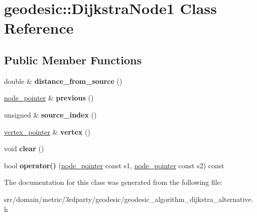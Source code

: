 \hypertarget{classgeodesic_1_1_dijkstra_node1}{}\section{geodesic\+:\+:Dijkstra\+Node1 Class Reference}
\label{classgeodesic_1_1_dijkstra_node1}
\subsection*{Public Member Functions}
\begin{DoxyCompactItemize}
\item 
\hypertarget{classgeodesic_1_1_dijkstra_node1_a4319ff7c12733f0d79aa119ddbd1bcdd}{}double \& {\bfseries distance\+\_\+from\+\_\+source} ()\label{classgeodesic_1_1_dijkstra_node1_a4319ff7c12733f0d79aa119ddbd1bcdd}

\item 
\hypertarget{classgeodesic_1_1_dijkstra_node1_abe89a88d7514fbad05b2ab66d995d8b0}{}\hyperlink{classgeodesic_1_1_dijkstra_node1}{node\+\_\+pointer} \& {\bfseries previous} ()\label{classgeodesic_1_1_dijkstra_node1_abe89a88d7514fbad05b2ab66d995d8b0}

\item 
\hypertarget{classgeodesic_1_1_dijkstra_node1_ac44a2aa7b48823d59145e240447ff1f5}{}unsigned \& {\bfseries source\+\_\+index} ()\label{classgeodesic_1_1_dijkstra_node1_ac44a2aa7b48823d59145e240447ff1f5}

\item 
\hypertarget{classgeodesic_1_1_dijkstra_node1_a88ef4f97b8e7070b07029c61d7e96904}{}\hyperlink{classgeodesic_1_1_vertex}{vertex\+\_\+pointer} \& {\bfseries vertex} ()\label{classgeodesic_1_1_dijkstra_node1_a88ef4f97b8e7070b07029c61d7e96904}

\item 
\hypertarget{classgeodesic_1_1_dijkstra_node1_ae6e22cf8c828285fbc89f149e3126b9c}{}void {\bfseries clear} ()\label{classgeodesic_1_1_dijkstra_node1_ae6e22cf8c828285fbc89f149e3126b9c}

\item 
\hypertarget{classgeodesic_1_1_dijkstra_node1_a0762ca782bc52cdb4346d937fee228de}{}bool {\bfseries operator()} (\hyperlink{classgeodesic_1_1_dijkstra_node1}{node\+\_\+pointer} const s1, \hyperlink{classgeodesic_1_1_dijkstra_node1}{node\+\_\+pointer} const s2) const \label{classgeodesic_1_1_dijkstra_node1_a0762ca782bc52cdb4346d937fee228de}

\end{DoxyCompactItemize}


The documentation for this class was generated from the following file\+:\begin{DoxyCompactItemize}
\item 
src/domain/metric/3rdparty/geodesic/geodesic\+\_\+algorithm\+\_\+dijkstra\+\_\+alternative.\+h\end{DoxyCompactItemize}
